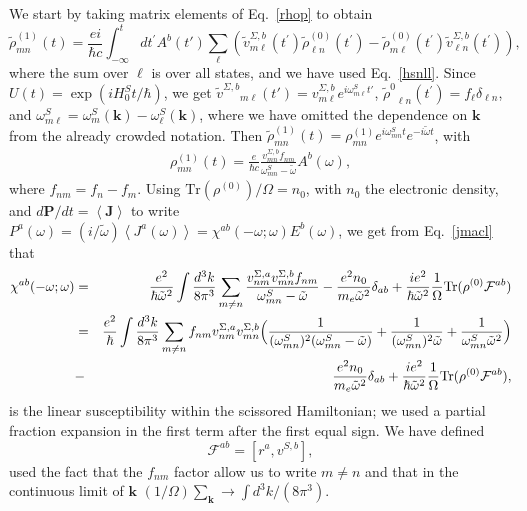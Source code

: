\documentclass[floatfix,prb,aps,superscriptaddress,11pt]{revtex4}
\begin{document}
We start by taking matrix elements of Eq.~\eqref{rhop} to obtain 
\begin{equation*}
\tilde{{\rho}}_{mn}^{(1)}(t)=\frac{ei}{\hbar c}\int_{-\infty
}^{t}dt^{\prime} A^b(t')
\sum_{\ell }\left( {\tilde{v}}_{m\ell }^{\Sigma ,b}(t^{\prime
}){\tilde{{\rho}}}_{\ell n}^{(0)}(t^{\prime })-{\tilde{{\rho}}}_{m\ell
}^{(0)}(t^{\prime }){\tilde{v}}_{\ell n}^{\Sigma ,b}(t^{\prime })\right) ,
\end{equation*}
where the sum over $\ell $ is over all states, and we have used 
Eq.~\eqref{hsnll}. Since $U(t)=\exp (iH_{0}^{S}t/\hbar )$, we get 
$
{\tilde v^{\Sigma,b}}_{m\ell}(t')
=
v^{\Sigma,b}_{m\ell}
e^{i\omega^S_{m\ell}t'}
$,
${\tilde{{\rho}}^{0}}_{\ell n}(t^{\prime })=f_{\ell }\delta_{\ell n}$, and
$\omega_{m\ell }^{S}=\omega_{m}^{S}(\mathbf{k})-\omega_{\ell }^{S}(\mathbf{k})$, where we have
omitted the dependence on $\mathbf{k}$ from the already crowded notation. Then
$\tilde{\rho}_{mn}^{(1)}(t)={\rho}_{mn}^{(1)}
e^{i\omega^S_{mn}t}  
e^{-i\tilde{\omega} t}
$,
with
\begin{eqnarray}\label{rho3}
\rho_{mn}^{(1)}(t)
=
\frac{e}{\hbar c}
\frac{v_{mn}^{\Sigma,b}f_{nm}}{
\omega^S_{mn}-\tilde\omega}
A^b(\omega)
,
\label{rhotn}
\end{eqnarray} 
where $f_{nm}=f_n-f_m$.
Using
$\mbox{Tr}({\rho}^{(0)})/\Omega=n_0$,
with $n_0$ the electronic density,
and $d\mathbf{P}/dt=\left\langle \mathbf{J}
\right\rangle $ to write $P^{a}(\omega)=(i/\tilde\omega)\left\langle J^{a}(\omega
)\right\rangle =\chi ^{ab}(-\omega;\omega)E^{b}(\omega)$, we get 
from Eq.~\eqref{jmacl} that
\begin{eqnarray}
\chi ^{ab}(-\omega;\omega) &=&\frac{e^{2}}{\hbar \tilde\omega^{2}}\int \frac{d^{3}k}{8\pi
^{3}}\sum_{m\ne n}\frac{v_{nm}^{\Sigma ,a}v_{mn}^{\Sigma ,b}f_{nm}}{\omega_{mn}^{S}-
\tilde\omega}-\frac{e^{2}n_0}{m_e\tilde\omega^{2}}\delta_{ab}+\frac{ie^{2}}{\hbar \tilde\omega^{2}}\frac{1}{
\Omega}\mbox{Tr}({\rho}^{(0)}\mathcal{F}^{ab})  \notag  \label{chi1} \\
&=&\frac{e^{2}}{\hbar }\int \frac{d^{3}k}{8\pi ^{3}}\sum_{m\ne n}f_{nm}v_{nm}^{
\Sigma ,a}v_{mn}^{\Sigma ,b}\Big(\frac{1}{(\omega_{mn}^{S})^{2}(\omega_{mn}^{S}-
\tilde\omega)}+\frac{1}{(\omega_{mn}^{S})^{2}\tilde\omega}+\frac{1}{\omega_{mn}^{S}\tilde\omega^{2}}\Big) 
\notag \\
&-&\frac{e^{2}n_0}{m_e\tilde\omega^{2}}\delta_{ab}+\frac{ie^{2}}{\hbar \tilde\omega^{2}}\frac{1}{\Omega
}\mbox{Tr}({\rho}^{(0)}\mathcal{F}^{ab}),
\end{eqnarray}
is the linear susceptibility within the scissored Hamiltonian; we used a
partial fraction expansion in the first term after the first equal sign.
We have defined 
\begin{equation}
\mathcal{F}^{ab}=[r^{a},v^{S,b}]
,
\label{calefe}
\end{equation}
used the fact that the $f_{nm}$ factor
allow us to write $m\ne n$
and that in the continuous limit of $\mathbf{k}$
$(1/\Omega)\sum_\mathbf{k}\to\int d^3k/(8\pi^3)$.
\end{document}
